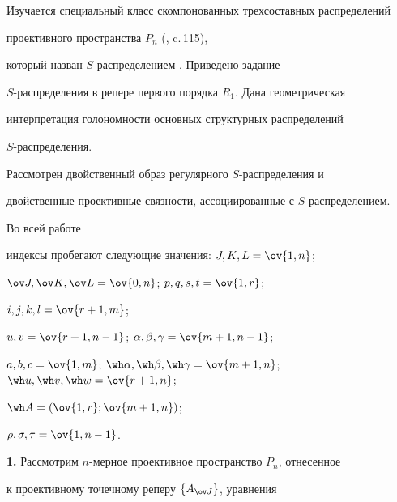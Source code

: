 

\pagestyle{plain} %







\maketitle


\label{begin}





Изучается специальный класс скомпонованных трехсоставных распределений


проективного пространства $P_n$ (\cite{rab1}, c.\,115),


который назван $S$-распределением \cite{rab2}. Приведено задание


$S$-распределения в репере первого порядка $R_1$. Дана геометрическая


интерпретация голономности основных структурных распределений


$S$-распределения.


Рассмотрен двойственный образ регулярного $S$-распределения и


двойственные проективные связности, ассоциированные с $S$-распределением.


Во всей работе


индексы пробегают следующие значения: $J, K, L=\ov{1,n}$;


$\ov J, \ov K, \ov L=\ov{0,n}$; $p, q, s, t=\ov{1,r}$;


$i, j, k, l=\ov{r+1,m}$;


$u, v=\ov{r+1,n-1}$; $\alpha, \beta, \gamma=\ov{m+1,n-1}$;


$a, b, c=\ov{1,m}$; $\wh \alpha, \wh \beta, \wh \gamma=


\ov{m+1,n}$; $\wh u, \wh v, \wh w=\ov{r+1,n}$;


$\wh A=(\ov{1,r};\ov{m+1,n})$;


$\rho, \sigma, \tau=\ov{1,n-1}$.


\medskip





{\bf 1.} Рассмотрим $n$-мерное проективное пространство $P_n$, отнесенное


к проективному точечному реперу $\{A_{\ov J}\}$, уравнения


